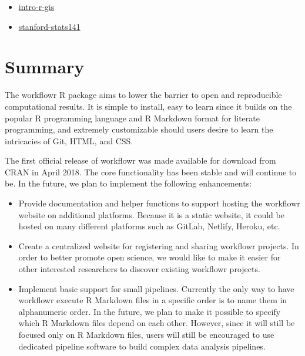 \documentclass[9pt,a4paper]{extarticle}
\begin{document}
\begin{itemize}
\begin{itemize}

\item \href{https://annakrystalli.me/intro-r-gis/}{intro-r-gis}

\item
\href{https://xiangzhu.github.io/stanford-stats141/}{stanford-stats141}

\end{itemize}

\end{itemize}


\section*{Summary}

The workflowr R package aims to lower the barrier to open and
reproducible computational results. It is simple to install, easy to
learn since it builds on the popular R programming language and R
Markdown format for literate programming, and extremely customizable
should users desire to learn the intricacies of Git, HTML, and CSS.

The first official release of workflowr was made available for download
from CRAN in April 2018. The core functionality has been stable and will
continue to be. In the future, we plan to implement the following
enhancements:

\begin{itemize}

\item Provide documentation and helper functions to support hosting the
workflowr website on additional platforms. Because it is a static
website, it could be hosted on many different platforms such as GitLab,
Netlify, Heroku, etc.

\item Create a centralized website for registering and sharing workflowr
projects. In order to better promote open science, we would like to make
it easier for other interested researchers to discover existing
workflowr projects.

\item Implement basic support for small pipelines. Currently the only
way to have workflowr execute R Markdown files in a specific order is to
name them in alphanumeric order. In the future, we plan to make it
possible to specify which R Markdown files depend on each other.
However, since it will still be focused only on R Markdown files, users
will still be encouraged to use dedicated pipeline software to build
complex data analysis pipelines.

\end{itemize}
\end{document}
